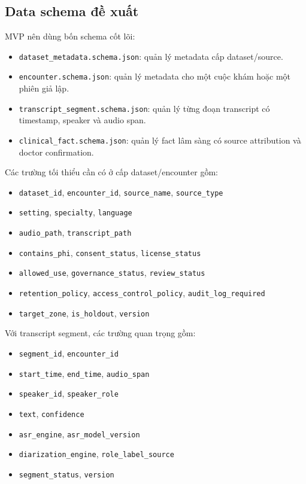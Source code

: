 \documentclass[12pt,a4paper]{article}
\begin{document}
\subsection{Data schema đề xuất}

MVP nên dùng bốn schema cốt lõi:

\begin{itemize}
    \item \texttt{dataset\_metadata.schema.json}: quản lý metadata cấp dataset/source.
    \item \texttt{encounter.schema.json}: quản lý metadata cho một cuộc khám hoặc một phiên giả lập.
    \item \texttt{transcript\_segment.schema.json}: quản lý từng đoạn transcript có timestamp, speaker và audio span.
    \item \texttt{clinical\_fact.schema.json}: quản lý fact lâm sàng có source attribution và doctor confirmation.
\end{itemize}

Các trường tối thiểu cần có ở cấp dataset/encounter gồm:

\begin{itemize}
    \item \texttt{dataset\_id}, \texttt{encounter\_id}, \texttt{source\_name}, \texttt{source\_type}
    \item \texttt{setting}, \texttt{specialty}, \texttt{language}
    \item \texttt{audio\_path}, \texttt{transcript\_path}
    \item \texttt{contains\_phi}, \texttt{consent\_status}, \texttt{license\_status}
    \item \texttt{allowed\_use}, \texttt{governance\_status}, \texttt{review\_status}
    \item \texttt{retention\_policy}, \texttt{access\_control\_policy}, \texttt{audit\_log\_required}
    \item \texttt{target\_zone}, \texttt{is\_holdout}, \texttt{version}
\end{itemize}

Với transcript segment, các trường quan trọng gồm:

\begin{itemize}
    \item \texttt{segment\_id}, \texttt{encounter\_id}
    \item \texttt{start\_time}, \texttt{end\_time}, \texttt{audio\_span}
    \item \texttt{speaker\_id}, \texttt{speaker\_role}
    \item \texttt{text}, \texttt{confidence}
    \item \texttt{asr\_engine}, \texttt{asr\_model\_version}
    \item \texttt{diarization\_engine}, \texttt{role\_label\_source}
    \item \texttt{segment\_status}, \texttt{version}
\end{itemize}
\end{document}
